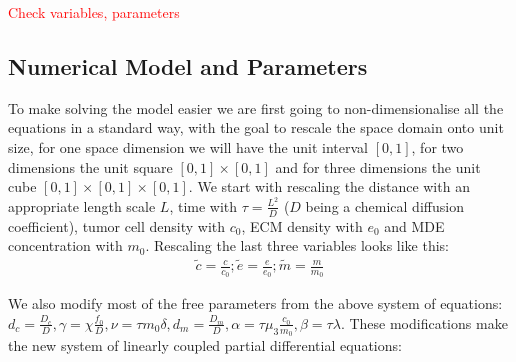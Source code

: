\textcolor{red}{Check variables, parameters}

\subsection{Numerical Model and Parameters}

To make solving the model easier we are first going to non-dimensionalise all the equations in a standard way, with the goal to rescale the space domain onto unit size, for one space dimension we will have the unit interval $[0,1]$, for two dimensions the unit square $[0,1] \times [0,1]$ and for three dimensions the unit cube $[0,1] \times [0,1] \times [0,1]$. 
We start with rescaling the distance with an appropriate length scale $L$, time with $\tau = \frac{L^2}{D}$ ($D$ being a chemical diffusion coefficient), tumor cell density with $c_0$, ECM density with $e_0$ and MDE concentration with $m_0$. Rescaling the last three variables looks like this:
\begin{align*}
    \tilde{c} = \frac{c}{c_0};  \tilde{e} = \frac{e}{e_0};  \tilde{m} = \frac{m}{m_0}  
\end{align*}

We also modify most of the free parameters from the above system of equations: $d_c = \frac{D_c}{D}, \gamma = \chi \frac{f_0}{D}, \nu = \tau m_0 \delta, d_m = \frac{D_m}{D}, \alpha = \tau \mu_3 \frac{c_0}{m_0}, \beta = \tau \lambda$. \newline 
These modifications make the new system of linearly coupled partial differential equations:

